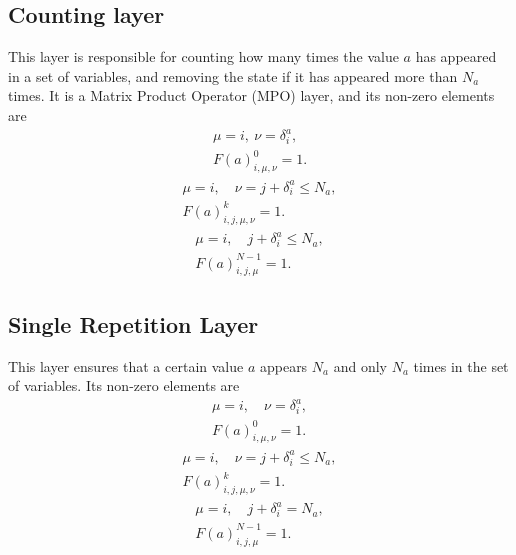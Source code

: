 \subsection{Counting layer}
This layer is responsible for counting how many times the value $a$ has appeared in a set of variables, and removing the state if it has appeared more than $N_a$ times. It is a Matrix Product Operator (MPO) layer, and its non-zero elements are
\begin{equation}
    \begin{gathered}
        \mu = i,\ \nu= \delta^{a}_{i},\\
        F(a)^0_{i,\mu,\nu} = 1. 
    \end{gathered}
\end{equation}
\begin{equation}
    \begin{gathered}
        \mu = i,\quad \nu= j+\delta^{a}_{i}\leq N_a,\\
        F(a)^k_{i,j,\mu,\nu} = 1. 
    \end{gathered}
\end{equation}
\begin{equation}
    \begin{gathered}
        \mu = i,\quad j+\delta^{a}_{i}\leq N_a,\\
        F(a)^{N-1}_{i,j,\mu} = 1. 
    \end{gathered}
\end{equation}

\subsection{Single Repetition Layer}
This layer ensures that a certain value $a$ appears $N_a$ and only $N_a$ times in the set of variables. Its non-zero elements are 
\begin{equation}
    \begin{gathered}
        \mu = i,\quad \nu= \delta^{a}_{i},\\
        F(a)^0_{i,\mu,\nu} = 1. 
    \end{gathered}
\end{equation}
\begin{equation}
    \begin{gathered}
        \mu = i,\quad \nu= j+\delta^{a}_{i}\leq N_a,\\
        F(a)^k_{i,j,\mu,\nu} = 1. 
    \end{gathered}
\end{equation}
\begin{equation}
    \begin{gathered}
        \mu = i,\quad j+\delta^{a}_{i}= N_a,\\
        F(a)^{N-1}_{i,j,\mu} = 1. 
    \end{gathered}
\end{equation}




